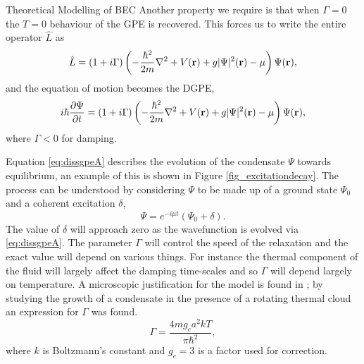 \begin{chapter}{\label{cha:theoretical_model}Theoretical Modelling of BEC}
	Another property we require is that when $\Gamma=0$ the $T=0$ behaviour of the GPE is recovered. This forces us to write the entire operator $\hat{L}$ as
	\begin{equation*}\label{eq:dissantiherm2}
		\hat{L} = (1+i\Gamma)\left( -\frac{\hbar^2}{2m}\nabla^2 + V({\bf r}) + g|\Psi|^2({\bf r}) - \mu \right) \Psi({\bf r}),
	\end{equation*}
	and the equation of motion becomes the DGPE,
	\begin{equation}\label{eq:dissgpeA}
		i\hbar \frac{\partial \Psi}{\partial t} = (1+i\Gamma)\left( -\frac{\hbar^2 }{2m}\nabla^2 + V({\bf r}) + g|\Psi|^2({\bf r}) - \mu \right) \Psi({\bf r}),
	\end{equation}
	where $\Gamma<0$ for damping.

	Equation \ref{eq:dissgpeA} describes the evolution of the condensate $\Psi$ towards equilibrium, an example of this is shown in Figure \ref{fig_excitationdecay}. The process can be understood by considering $\Psi$ to be made up of a ground state $\Psi_0$ and a coherent excitation $\delta$,
	\begin{equation*}\label{eq:dissantiherm2}
		\Psi = e^{-i \mu t}(\Psi_0 + \delta).
	\end{equation*}
	The value of $\delta$ will approach zero as the wavefunction is evolved via \ref{eq:dissgpeA}. The parameter $\Gamma$ will control the speed of the relaxation and the exact value will depend on various things. For instance the thermal component of the fluid will largely affect the damping time-scales and so $\Gamma$ will depend largely on temperature. A microscopic justification for the model is found in \cite{penckwitt_2002, gardiner97}; by studying the growth of a condensate in the presence of a rotating thermal cloud an expression for $\Gamma$ was found.
		\begin{equation}\label{eq:dissgamma}
		\Gamma = \frac{4mg_ca^2kT}{\pi\hbar^2},
		\end{equation}
	where $k$ is Boltzmann's constant and $g_c = 3$ is a factor used for correction.
\begin{figure}
	\centering
   \begin{tikzpicture}

\end{tikzpicture}
\end{figure}
\end{chapter}
